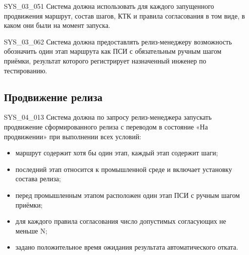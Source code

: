 \documentclass{tpks}
\begin{document}
\begin{req}{SYS_03_05}{1}
Система должна использовать для каждого запущенного продвижения маршрут, состав шагов, КТК и правила согласования в том виде, в каком они были на момент запуска.
\end{req}

\begin{req}{SYS_03_06}{2}
Система должна предоставлять релиз-менеджеру возможность обозначить один этап маршрута
как ПСИ с обязательным ручным шагом приёмки, результат которого регистрирует
назначенный инженер по тестированию.
\end{req}

\subsection{Продвижение релиза}

\begin{req}{SYS_04_01}{3}
Система должна по запросу релиз-менеджера запускать продвижение сформированного релиза с переводом в состояние «На продвижении» при выполнении всех условий:
\begin{itemize}
\item маршрут содержит хотя бы один этап, каждый этап содержит шаги;
\item последний этап относится к промышленной среде и включает установку состава релиза;
\item перед промышленным этапом расположен один этап ПСИ с ручным шагом приёмки;
\item для каждого правила согласования число допустимых согласующих не меньше N;
\item задано положительное время ожидания результата автоматического отката.
\end{itemize}
\end{req}
\end{document}
